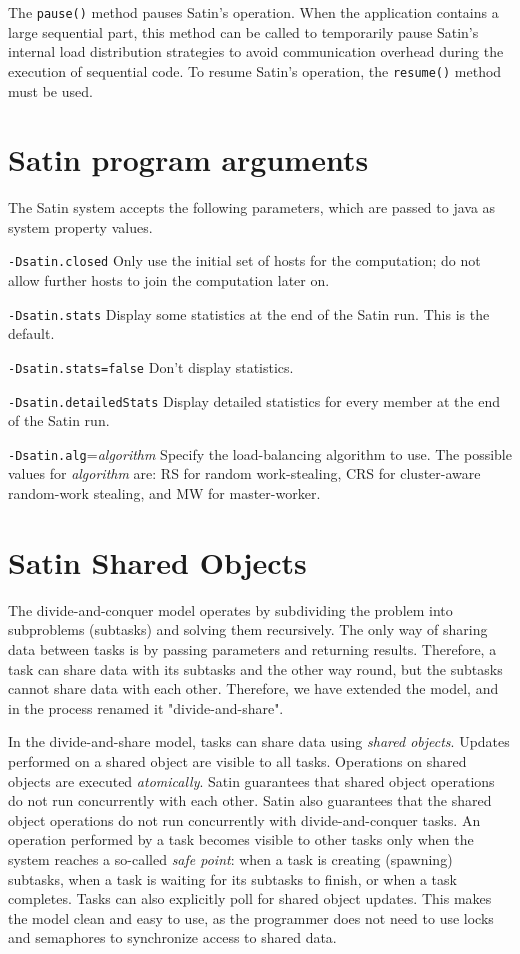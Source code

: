 \documentclass[10pt]{article}
\begin{document}
The \texttt{pause()} method pauses Satin's operation. When the application
contains a large sequential part, this method can be called to temporarily
pause Satin's internal load distribution strategies to avoid communication
overhead during the execution of sequential code.
To resume Satin's operation, the \texttt{resume()} method must be used.

\section{Satin program arguments}

The Satin system accepts the following parameters, which are
passed to java as system property values.
\begin{description}
\item{\texttt{-Dsatin.closed}}
Only use the initial set of hosts for the computation; do not allow
further hosts to join the computation later on.
\item{\texttt{-Dsatin.stats}}
Display some statistics at the end of the Satin run. This is the default.
\item{\texttt{-Dsatin.stats=false}}
Don't display statistics.
\item{\texttt{-Dsatin.detailedStats}}
Display detailed statistics for every member at the end of the Satin run.
\item{\texttt{-Dsatin.alg}=\emph{algorithm}}
Specify the load-balancing algorithm to use. The possible values for
\emph{algorithm} are: RS for random work-stealing, CRS for cluster-aware
random-work stealing, and MW for master-worker.
\end{description}

\section{Satin Shared Objects}

The divide-and-conquer model operates by subdividing the problem into
subproblems (subtasks) and solving them recursively.
The only way of sharing data between tasks is by passing parameters
and returning results.
Therefore, a task can share data with its subtasks and the
other way round, but the subtasks cannot share data with each other.
Therefore, we have extended the model, and in the process renamed it
"divide-and-share".

In the divide-and-share model, tasks can share data using
\textit{shared objects}.
Updates performed on a shared object are visible to all tasks.
Operations on shared objects are executed \textit{atomically}.
Satin guarantees that shared object operations do not run concurrently with
each other. Satin also guarantees that the shared object operations do not
run concurrently with divide-and-conquer tasks. An operation performed
by a task becomes visible to other tasks only when the system reaches a
so-called \textit{safe point}: when a task is creating (spawning)
subtasks, when a task is waiting for its subtasks to finish, or when a
task completes. Tasks can also explicitly poll for shared object
updates. This makes the model clean and easy to use, as the programmer
does not need to use locks and semaphores to synchronize access to
shared data.
\end{document}
